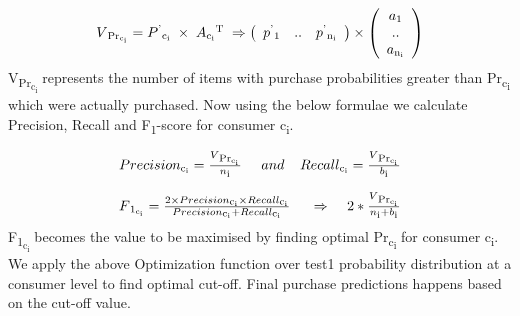   \begin{equation}
    \begin{array}{l}
      V\textsubscript{Pr\textsubscript{c\textsubscript{i}}} = 
      P\textsuperscript{'}\textsubscript{c\textsubscript{i}}
      \;\times\; A\textsubscript{c\textsubscript{i}}\textsuperscript{T}
      \;
      \Rightarrow	
      \left( \begin{array}{ccc}
      p\textsuperscript{'}\textsubscript{1} & .. & 
      p\textsuperscript{'}\textsubscript{n\textsubscript{i}}
      \end{array} \right)
      \times
      \left( \begin{array}{ccc}
      a\textsubscript{1} \\
      .. \\
      a\textsubscript{n\textsubscript{i}} \\
      \end{array} \right)

    \end{array}
    \label{eqn:probability}
  \end{equation}
V\textsubscript{Pr\textsubscript{c\textsubscript{i}}} represents the number of items with purchase 
probabilities greater than Pr\textsubscript{c\textsubscript{i}} which were actually purchased. Now using the below 
formulae we calculate Precision, Recall and F\textsubscript{1}-score for consumer c\textsubscript{i}.

  \begin{equation}
    \begin{array}{l}
      Precision\textsubscript{c\textsubscript{i}}= \frac{V\textsubscript{Pr\textsubscript{c\textsubscript{i}}}} {n\textsubscript{i}}
      \;\;\;\;\;and\;\;\;\;
      Recall\textsubscript{c\textsubscript{i}}= \frac{V\textsubscript{Pr\textsubscript{c\textsubscript{i}}}} {b\textsubscript{i}}
    \end{array}
    \label{eqn:F1}
  \end{equation}

  \begin{equation}
    \begin{array}{l}
      F\textsubscript{1\textsubscript{c\textsubscript{i}}} = \frac{2 \times Precision\textsubscript{c\textsubscript{i}} 
      \times Recall\textsubscript{c\textsubscript{i}}} 
      {Precision\textsubscript{c\textsubscript{i}} + Recall\textsubscript{c\textsubscript{i}}}
      \;
      \;\;\;\;\Rightarrow	\;\;\;\;
      2 * 
      \frac{
        V\textsubscript{Pr\textsubscript{c\textsubscript{i}}}
      }
      {
        n\textsubscript{i} + b\textsubscript{i}
      }
    \end{array}
    \label{eqn:Optimizer}
  \end{equation}
F\textsubscript{1\textsubscript{c\textsubscript{i}}} becomes the value to be maximised
by finding optimal Pr\textsubscript{c\textsubscript{i}} for consumer c\textsubscript{i}.
We apply the above Optimization function over test1 probability distribution 
at a consumer level to find optimal cut-off. Final purchase predictions happens 
based on the cut-off value.